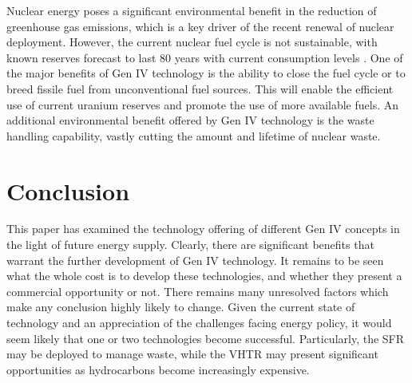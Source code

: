 \documentclass[journal]{IEEEtran}
\begin{document}
Nuclear energy poses a significant environmental benefit in the reduction of greenhouse gas emissions, which is a key driver of the recent renewal of nuclear deployment.
However, the current nuclear fuel cycle is not sustainable, with known reserves forecast to last 80 years with current consumption levels \cite{Marques2010a}.
One of the major benefits of Gen IV technology is the ability to close the fuel cycle or to breed fissile fuel from unconventional fuel sources.
This will enable the efficient use of current uranium reserves and promote the use of more available fuels.
An additional environmental benefit offered by Gen IV technology is the waste handling capability, vastly cutting the amount and lifetime of nuclear waste.






\section{Conclusion}

This paper has examined the technology offering of different Gen IV concepts in the light of future energy supply.
Clearly, there are significant benefits that warrant the further development of Gen IV technology.
It remains to be seen what the whole cost is to develop these technologies, and whether they present a commercial opportunity or not.
There remains many unresolved factors which make any conclusion highly likely to change.
Given the current state of technology and an appreciation of the challenges facing energy policy, it would seem likely that one or two technologies become successful. Particularly, the SFR may be deployed to manage waste, while the VHTR may present significant opportunities as hydrocarbons become increasingly expensive.




\appendices
\end{document}
